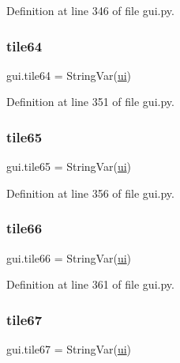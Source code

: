 Definition at line 346 of file gui.\+py.

\mbox{\label{namespacegui_a19cdc2ff759a4ddb510a64dee3011d9c}} 
\subsubsection{\texorpdfstring{tile64}{tile64}}
{\footnotesize\ttfamily gui.\+tile64 = String\+Var(\mbox{\hyperlink{namespacegui_a40ab7281456eadbea2dc2038f5c24fa1}{ui}})}



Definition at line 351 of file gui.\+py.

\mbox{\label{namespacegui_a16b2bd5f38987cf5d4e029ef779de240}} 
\subsubsection{\texorpdfstring{tile65}{tile65}}
{\footnotesize\ttfamily gui.\+tile65 = String\+Var(\mbox{\hyperlink{namespacegui_a40ab7281456eadbea2dc2038f5c24fa1}{ui}})}



Definition at line 356 of file gui.\+py.

\mbox{\label{namespacegui_ae611eb5c07dd6a1b2c69b5d1367f7e1d}} 
\subsubsection{\texorpdfstring{tile66}{tile66}}
{\footnotesize\ttfamily gui.\+tile66 = String\+Var(\mbox{\hyperlink{namespacegui_a40ab7281456eadbea2dc2038f5c24fa1}{ui}})}



Definition at line 361 of file gui.\+py.

\mbox{\label{namespacegui_a6385015d5e2e403c5f8d30ef5339646e}} 
\subsubsection{\texorpdfstring{tile67}{tile67}}
{\footnotesize\ttfamily gui.\+tile67 = String\+Var(\mbox{\hyperlink{namespacegui_a40ab7281456eadbea2dc2038f5c24fa1}{ui}})}



